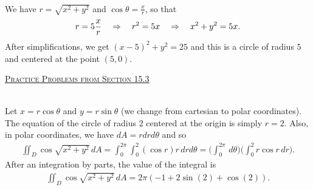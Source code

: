 	\\
	We have $r = \sqrt{x^2 + y^2}$ and $\cos \theta = \frac{x}{r}$, so that
		\begin{align*}
		r = 5 \frac{x}{r} \quad \Rightarrow \quad r^2 = 5x \quad \Rightarrow \quad x^2 + y^2 = 5x .
		\end{align*} 
	After simplifications, we get $(x - 5)^2 + y^2 = 25$ and this is a circle of radius $5$ and centered at the point $(5, 0)$.

	\vspace*{1cm}

	\underline{\textsc{Practice Problems from Section 15.3}}

	\\
	Let $x = r \cos \theta$ and $y = r \sin \theta$ (we change from cartesian to polar coordinates). The equation of the circle of radius $2$ centered at the origin is simply $r = 2$. Also, in polar coordinates, we have $dA = r dr d\theta$ and so
		\begin{align*}
		\iint_D \cos \sqrt{x^2 + y^2} \, dA = \int_0^{2\pi} \int_0^2 (\cos r) r \, dr d\theta = \Big( \int_0^{2\pi} \, d\theta \Big) \Big( \int_0^2 r \cos r \, dr \Big) .
		\end{align*}
	After an integration by parts, the value of the integral is
		\begin{align*}
		\iint_D \cos \sqrt{x^2 + y^2} \, dA = 2\pi (-1 + 2 \sin (2) + \cos (2) ) .
		\end{align*}
	
	\spc
	
